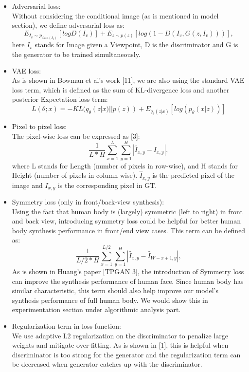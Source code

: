 \documentclass[10pt,conference]{IEEEtran}
\begin{document}
\begin{itemize}
\item Adversarial loss:\\
Without considering the conditional image (as is mentioned in model section), we define adversarial loss as:
$$ E_{I_v \sim p_{data(I_v)}}[log D(I_v)] + E_{z \sim p(z)}[log (1- D(I_v, G(z, I_v)))], $$
here $I_v$ stands for Image given a Viewpoint, D is the discriminator and G is the generator to be trained simultaneously.

\item VAE loss:\\
As is shown in Bowman et al's work [11], we are also using the standard VAE loss term, which is defined as the sum of KL-divergence loss and another posterior Expectation loss term:
$$ L(\theta;x)= -KL(q_\theta(z|x)||p(z))+E_{q_\theta(z|x)}[log(p_\theta(x|z))] $$

\item Pixel to pixel loss:\\
The pixel-wise loss can be expressed as [3]:
$$ \frac{1}{L*H} \sum_{x=1}^L \sum_{y=1}^H |\hat{I}_{x,y}- I_{x,y}|, $$
where L stands for Length (number of pixels in row-wise), and H stands for Height (number of pixels in column-wise). $\hat{I}_{x,y}$ is the predicted pixel of the image and $I_{x,y}$ is the corresponding pixel in GT.

\item Symmetry loss (only in front/back-view synthesis):\\
Using the fact that human body is (largely) symmetric (left to right) in front and back view, introducing symmetry loss could be helpful for better human body synthesis performance in front/end view cases. This term can be defined as:
$$ \frac{1}{L/2 *H} \sum_{x=1}^{L/2} \sum_{y=1}^H |\hat{I}_{x,y}- \hat{I}_{W-x+1,y}|, $$
As is shown in Huang's paper [TPGAN 3], the introduction of Symmetry loss can improve the synthesis performance of human face. Since human body has similar characteristic, this term should also help improve our model's synthesis performance of full human body. We would show this in experimentation section under algorithmic analysis part.

\item Regularization term in loss function:\\
We use adaptive L2 regularization on the discriminator to penalize large weights and mitigate over-fitting. As is shown in [1], this is helpful when discriminator is too strong for the generator and the regularization term can be decreased when generator catches up with the discriminator.



\end{itemize}
\end{document}
